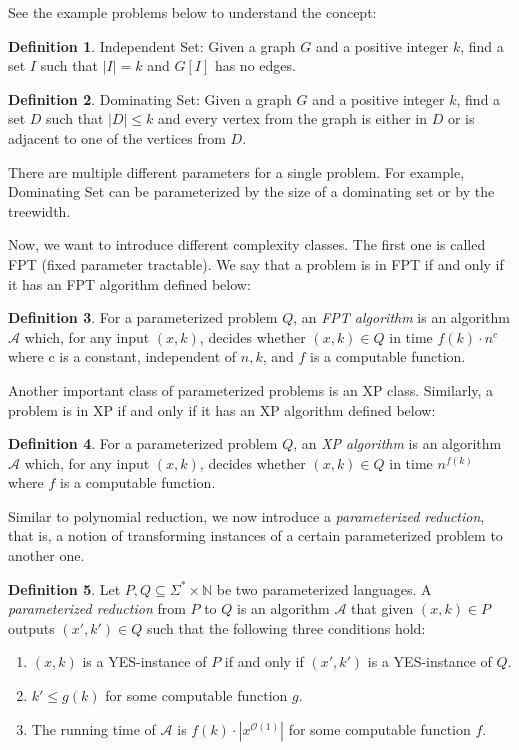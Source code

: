 \documentclass[en]{pracamgr}
\theoremstyle{definition}
\newtheorem{definition}{Definition}
\newcommand{\domsetp}{{\sc Dominating Set}}
\newcommand{\indset}{{\sc Independent Set}}
\begin{document}
See the example problems below to understand the concept:

\begin{definition}
	\indset{}: Given a graph $G$ and a positive integer $k$, find a set $I$ such that $|I| = k$ and $G[I]$ has no edges.
\end{definition}

\begin{definition}
	\domsetp{}: Given a graph $G$ and a positive integer $k$, find a set $D$ such that $|D| \leq k$ and every vertex from the graph is either in $D$ or is adjacent to one of the vertices from $D$.
\end{definition}

There are multiple different parameters for a single problem. For example, \domsetp{} can be parameterized by the size of a dominating set or by the treewidth. 

Now, we want to introduce different complexity classes. The first one is called FPT (fixed parameter tractable). We say that a problem is in FPT if and only if it has an FPT algorithm defined below:

\begin{definition}\label{FPT algorithm}
	For a parameterized problem $Q$, an \textit{FPT algorithm} is an algorithm $\mathcal{A}$ which, for any input $(x,k)$, decides whether $(x,k) \in Q$ in time $f(k)\cdot n^c$ where c is a constant, independent of $n,k$, and $f$ is a computable function.
\end{definition}

Another important class of parameterized problems is an XP class. Similarly, a problem is in XP if and only if it has an XP algorithm defined below:

\begin{definition}
	For a parameterized problem $Q$, an \textit{XP algorithm} is an algorithm $\mathcal{A}$ which, for any input $(x,k)$, decides whether $(x,k) \in Q$ in time $n^{f(k)}$ where $f$ is a computable function.
\end{definition}

Similar to polynomial reduction, we now introduce a \textit{parameterized reduction}, that is, a notion of transforming instances of a certain parameterized problem to another one.

\begin{definition}
	Let $P,Q \subseteq \Sigma^* \times \mathbb{N}$ be two parameterized languages. A  \textit{parameterized reduction} from $P$ to $Q$ is an algorithm $\mathcal{A}$ that given $(x,k) \in P$ outputs $(x',k') \in Q$ such that the following three conditions hold:
	\begin{enumerate}
		\item $(x,k)$ is a YES-instance of $P$ if and only if $(x',k')$ is a YES-instance of $Q$.
		\item $k' \leq g(k)$ for some computable function $g$.
		\item The running time of $\mathcal{A}$ is $f(k) \cdot |x^{\mathcal{O}(1)}|$ for some computable function $f$.
	\end{enumerate}
\end{definition}
\end{document}
